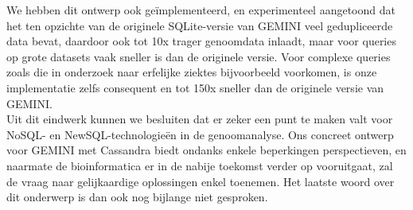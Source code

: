 We hebben dit ontwerp ook ge\"implementeerd, en experimenteel aangetoond dat het ten opzichte van de originele SQLite-versie van GEMINI veel gedupliceerde data bevat, daardoor ook tot 10x trager genoomdata inlaadt, maar voor queries op grote datasets vaak sneller is dan de originele versie. Voor complexe queries zoals die in onderzoek naar erfelijke ziektes bijvoorbeeld voorkomen, is onze implementatie zelfs consequent en tot 150x sneller dan de originele versie van GEMINI.\\
Uit dit eindwerk kunnen we besluiten dat er zeker een punt te maken valt voor NoSQL- en NewSQL-technologie\"en in de genoomanalyse. Ons concreet ontwerp voor GEMINI met Cassandra biedt ondanks enkele beperkingen perspectieven, en naarmate de bioinformatica er in de nabije toekomst verder op vooruitgaat, zal de vraag naar gelijkaardige oplossingen enkel toenemen. Het laatste woord over dit onderwerp is dan ook nog bijlange niet gesproken.
